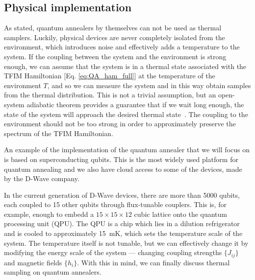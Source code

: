 \documentclass[12pt,a4paper]{article}
\begin{document}
\subsection*{Physical implementation} \label{sec:physical_implementation}
\hspace*{0.3cm}
As stated, quantum annealers by themselves can not be used as thermal samplers. Luckily, physical devices
are never completely isolated from the environment, which introduces noise and effectively
adds a temperature to the system. If the coupling between the system and the environment is strong enough,
we can assume that the system is in a thermal state associated with the TFIM Hamiltonian [Eq. \eqref{eq:QA_ham_full}]
at the temperature of the environment $T$, and so we can measure the system and in this way obtain samples from the thermal distribution.
This is not a trivial assumption, but an open-system adiabatic theorem 
provides a guarantee that if we wait long enough, the state of the system will approach the desired
thermal state~\cite*{venuti2016adiabaticity}. The coupling to the environment
should not be too strong in order to approximately preserve the spectrum of the TFIM Hamiltonian.

\hspace*{0.3cm}
An example of the implementation of the quantum annealer that we will focus on
is based on superconducting qubits. This is the most widely used platform for quantum annealing
and we also have cloud access to some of the devices, made by the D-Wave company.

\hspace*{0.3cm}
In the current generation of D-Wave devices, there are more than 5000 qubits, each coupled to 15 other qubits
through flux-tunable couplers. This is, for example, enough to embedd a $15 \times 15 \times 12$ cubic
lattice onto the quantum processing unit (QPU). The QPU is a chip which lies in a dilution refrigerator
and is cooled to approximately \SI{15}{mK}, which sets the temperature scale of the system.
The temperature itself is not tunable, but we can effectively change
it by modifying the energy scale of the system --- changing coupling strengths $\{J_{ij}\}$ and magnetic fields $\{h_i\}$.
With this in mind, we can finally discuss thermal sampling on quantum annealers.
\end{document}
